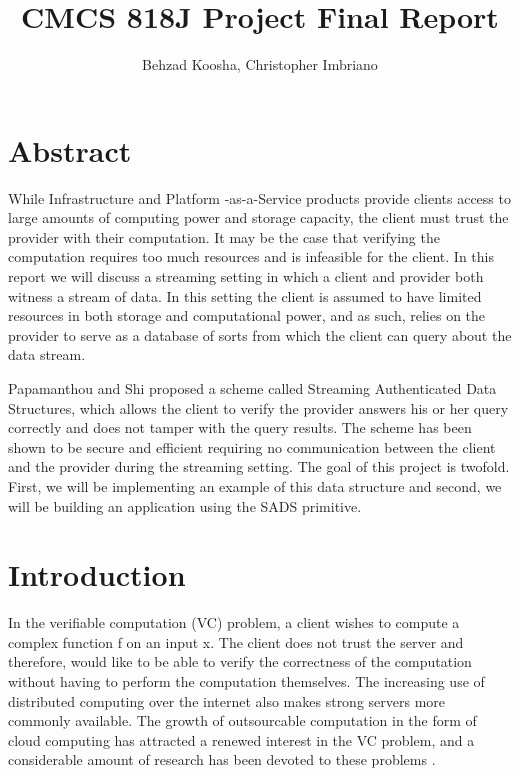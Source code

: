 \documentclass[11pt, letterpaper, oneside]{article}
\begin{document}
\title{\textbf{CMCS 818J Project Final Report}}
\author{Behzad Koosha, Christopher Imbriano}

\maketitle

\section{Abstract}

	While Infrastructure and Platform -as-a-Service products provide clients access to large amounts of computing power and storage capacity, the client must trust the provider with their computation.
	It may be the case that verifying the computation requires too much resources and is infeasible for the client.
	In this report we will discuss a streaming setting in which a client and provider both witness a stream of data.
	In this setting the client is assumed to have limited resources in both storage and computational power, and as such, relies on the provider to serve as a database of sorts from which the client can query about the data stream.
	
	Papamanthou and Shi \cite{sads} proposed a scheme called Streaming Authenticated Data Structures, which allows the client to verify the provider answers his or her query correctly and does not tamper with the query results.
	The scheme has been shown to be secure and efficient requiring no communication between the client and the provider during the streaming setting.
	The goal of this project is twofold. First, we will be implementing an example of this data
	structure and second, we will be building an application using the SADS primitive. 


\section{Introduction}

	In the verifiable computation (VC) problem, a client wishes to compute a complex function f on an input x.
	The client does not trust the server and therefore, would like to be able to verify the correctness of the computation without having to perform the computation themselves.
	The increasing use of distributed computing over the internet also makes strong servers more commonly available.
	The growth of outsourcable computation in the form of cloud computing has attracted a renewed interest in the VC problem, and a considerable amount of research has been devoted to these problems \cite{evsc}.
	
\end{document}
